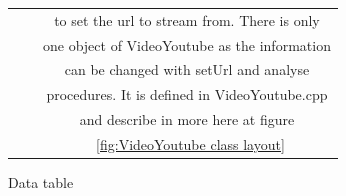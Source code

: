 \documentclass{article}
\begin{document}
\begin{figure}[H]
\begin{center}
\begin{tabular} { | c | c | c |}
                                             &&to set the url to stream from. There is only   \\
                                             &&one object of VideoYoutube as the information  \\
                                             &&can be changed with setUrl and analyse         \\
                                             &&procedures. It is defined in VideoYoutube.cpp  \\
                                             &&and describe in more here at figure            \\
                                             &&~\ref{fig:VideoYoutube class layout}           \\ \hline
        \end{tabular}
    \end{center}
    \caption{Data table} \label{fig:dataTable}
\end{figure}
\newpage
\end{document}
